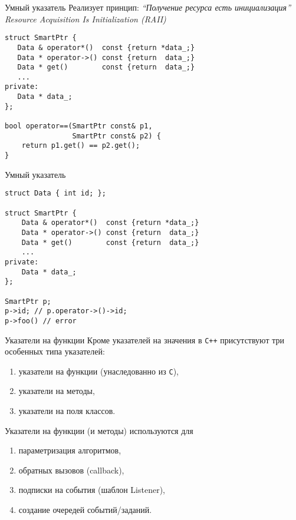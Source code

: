 \documentclass{beamer}
\begin{document}
\begin{frame}[fragile]{Умный указатель}
Реализует принцип: {\em ``Получение ресурса есть инициализация''
Resource Acquisition Is Initialization (RAII)}
\begin{lstlisting}
struct SmartPtr {
   Data & operator*()  const {return *data_;}
   Data * operator->() const {return  data_;}
   Data * get()        const {return  data_;}
   ... 
private:
   Data * data_;
};

bool operator==(SmartPtr const& p1,
                SmartPtr const& p2) {
    return p1.get() == p2.get();
}
    \end{lstlisting}
\end{frame}

\begin{frame}[fragile]{Умный указатель}
    \begin{lstlisting}
struct Data { int id; };

struct SmartPtr {
    Data & operator*()  const {return *data_;}
    Data * operator->() const {return  data_;}
    Data * get()        const {return  data_;}
    ... 
private:
    Data * data_;
};

SmartPtr p;
p->id; // p.operator->()->id;
p->foo() // error
        \end{lstlisting}
\end{frame}

\begin{frame}[fragile]{Указатели на функции}
    Кроме указателей на значения в \texttt{C++} присутствуют три особенных 
    типа указателей:
    \begin{enumerate}
        \item указатели на функции (унаследованно из \texttt{C}),
        \item указатели на методы,
        \item указатели на поля классов.
    \end{enumerate}
    
    Указатели на функции (и методы) используются для
    \begin{enumerate}
        \item параметризация алгоритмов,
        \item обратных вызовов (callback),
        \item подписки на события (шаблон Listener),
        \item создание очередей событий/заданий.
    \end{enumerate}
\end{frame}
\end{document}
